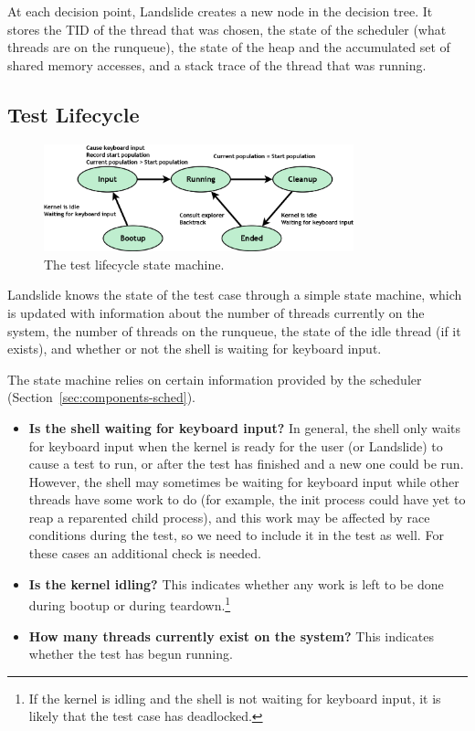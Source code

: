 At each decision point, Landslide creates a new node in the decision tree. It stores the TID of the thread that was chosen, the state of the scheduler (what threads are on the runqueue), the state of the heap and the accumulated set of shared memory accesses, and a stack trace of the thread that was running.

\subsection{Test Lifecycle}
\label{sec:components-test}

\begin{figure}[t]
	\begin{center}
		\includegraphics[width=0.8\textwidth]{teststate.png}
	\end{center}
	\caption{The test lifecycle state machine.}
	\label{fig:teststate}
\end{figure}
Landslide knows the state of the test case through a simple state machine, which is updated with information about the number of threads currently on the system, the number of threads on the runqueue, the state of the idle thread (if it exists), and whether or not the shell is waiting for keyboard input.

The state machine relies on certain information provided by the scheduler (Section~\ref{sec:components-sched}).

\begin{itemize}
	\item {\bf Is the shell waiting for keyboard input?} In general, the shell only waits for keyboard input when the kernel is ready for the user (or Landslide) to cause a test to run, or after the test has finished and a new one could be run.
		However, the shell may sometimes be waiting for keyboard input while other threads have some work to do (for example, the init process could have yet to reap a reparented child process), and this work may be affected by race conditions during the test, so we need to include it in the test as well. For these cases an additional check is needed.
	\item {\bf Is the kernel idling?} This indicates whether any work is left to be done during bootup or during teardown.\footnote{
		If the kernel is idling and the shell is not waiting for keyboard input, it is likely that the test case has deadlocked.}
	\item {\bf How many threads currently exist on the system?} This indicates whether the test has begun running.
\end{itemize}


